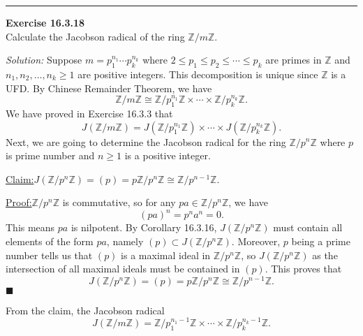 \documentclass[a4paper, 12pt]{article}
\newenvironment{problem}[2][Exercise]
    { \begin{mdframed}[backgroundcolor=gray!20] \textbf{#1 #2} \\}
    {  \end{mdframed}}
\newenvironment{solution}
    {\textit{Solution:}}
    {}
\newenvironment{claim}[1]{\par\noindent\underline{Claim:}\space#1}{}
\newenvironment{claimproof}[1]{\par\noindent\underline{Proof:}\space#1}{\hfill $\blacksquare$}
\begin{document}
\noindent\rule{7in}{2.8pt}
\begin{problem}{16.3.18}
Calculate the Jacobson radical of the ring \(\mathbb{Z}/ m \mathbb{Z}\).
\end{problem}
\begin{solution}
Suppose \(m=p_1^{n_1}\cdots p_k^{n_k}\) where \(2\leq p_1\leq p_2\leq \cdots\leq p_k\) are primes in \(\mathbb{Z}\) and \(n_1,n_2,\ldots,n_k\geq 1\) are positive integers. This decomposition is unique since \(\mathbb{Z}\) is a UFD. By 
Chinese Remainder Theorem, we have 
\[\mathbb{Z}/m \mathbb{Z}\cong \mathbb{Z}/p_1^{n_1} \mathbb{Z}\times \cdots\times \mathbb{Z}/p_k^{n_k}\mathbb{Z}.\]
We have proved in Exercise 16.3.3 that 
\[J(\mathbb{Z}/m \mathbb{Z})=J(\mathbb{Z}/p_1^{n_1}\mathbb{Z})\times \cdots\times J(\mathbb{Z}/p_k^{n_k} \mathbb{Z}).\]
Next, we are going to determine the Jacobson radical for the ring \(\mathbb{Z}/p^n \mathbb{Z}\) where \(p\) is prime number and \(n\geq 1\) is a positive integer. 
\begin{claim}
\(J(\mathbb{Z}/p^n \mathbb{Z})=(p)=p \mathbb{Z}/p^n \mathbb{Z}\cong \mathbb{Z}/p^{n-1}\mathbb{Z}\).
\end{claim}
\begin{claimproof}
\(\mathbb{Z}/p^n \mathbb{Z}\) is commutative, so for any \(pa\in \mathbb{Z}/p^n \mathbb{Z}\), we have 
\[(pa)^n=p^na^n=0.\]
This means \(pa\) is nilpotent. By Corollary 16.3.16, \(J(\mathbb{Z}/p^n \mathbb{Z})\) must contain all elements of the form \(pa\), namely \((p)\subset J(\mathbb{Z}/p^n \mathbb{Z})\). Moreover, \(p\) being a prime number tells us that 
\((p)\) is a maximal ideal in \(\mathbb{Z}/p^n \mathbb{Z}\), so \(J(\mathbb{Z}/p^n \mathbb{Z})\) as the intersection of all maximal ideals must be contained in \((p)\). This proves that 
 \[J(\mathbb{Z}/p^n \mathbb{Z})=(p)=p \mathbb{Z}/p^n \mathbb{Z}\cong \mathbb{Z}/p^{n-1}\mathbb{Z}.\]
\end{claimproof}

From the claim, the Jacobson radical 
\[J(\mathbb{Z}/m \mathbb{Z})=\mathbb{Z}/p_1^{n_1-1}\mathbb{Z}\times \cdots\times \mathbb{Z}/p_k^{n_k-1}\mathbb{Z}.\]
\end{solution}
\end{document}
